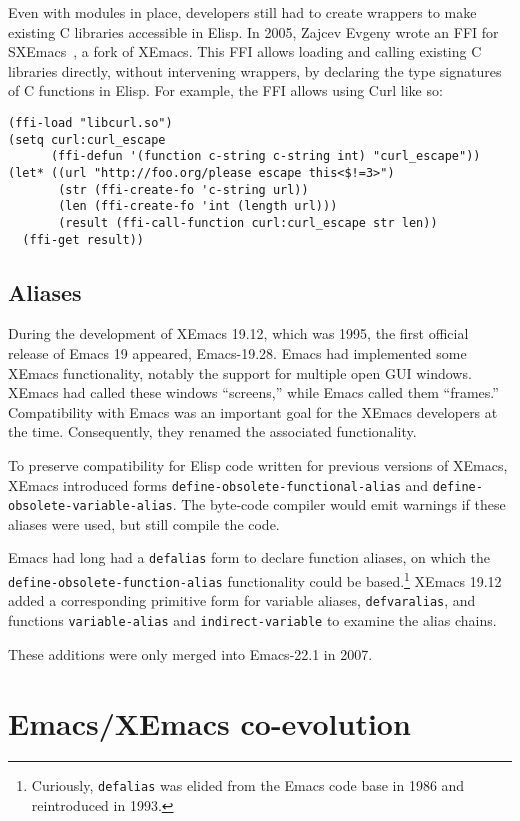 \documentclass[format=acmsmall, review=false, screen=true]{acmart}
\newcommand \Elisp {Elisp}
\begin{document}
Even with modules in place, developers still had to create wrappers to
make existing C libraries accessible in \Elisp{}.  In 2005, Zajcev
Evgeny wrote an FFI for SXEmacs~\cite{SXEmacs}, a fork of XEmacs.
This FFI allows loading and calling existing C libraries directly,
without intervening wrappers, by declaring the type signatures of C
functions in \Elisp{}.  For example, the FFI allows using Curl like
so:
%
\begin{verbatim}
(ffi-load "libcurl.so")
(setq curl:curl_escape
      (ffi-defun '(function c-string c-string int) "curl_escape"))
(let* ((url "http://foo.org/please escape this<$!=3>")
       (str (ffi-create-fo 'c-string url))
       (len (ffi-create-fo 'int (length url)))
       (result (ffi-call-function curl:curl_escape str len))
  (ffi-get result))
\end{verbatim}

\subsection{Aliases}

During the development of XEmacs 19.12, which was 1995, the first
official release of Emacs 19 appeared, Emacs-19.28.  Emacs had
implemented some XEmacs functionality, notably the support for
multiple open GUI windows.  XEmacs had called these windows
``screens,'' while Emacs called them ``frames.''  Compatibility with
Emacs was an important goal for the XEmacs developers at the time.
Consequently, they renamed the associated functionality.

To preserve compatibility for \Elisp{} code written for previous
versions of XEmacs, XEmacs introduced forms
\texttt{define-obsolete-functional-alias} and
\texttt{define-obsolete-variable-alias}.  The byte-code compiler would
emit warnings if these aliases were used, but still compile the code.

Emacs had long had a \texttt{defalias} form to declare function
aliases, on which the \texttt{define-obsolete-function-alias}
functionality could be based.\footnote{Curiously, \texttt{defalias}
  was elided from the Emacs code base in 1986 and reintroduced in
  1993.}  XEmacs 19.12 added a corresponding primitive form for variable
aliases, \texttt{defvaralias}, and functions \texttt{variable-alias}
and \texttt{indirect-variable} to examine the alias chains.

These additions were only merged into Emacs-22.1 in 2007.

\section{Emacs/XEmacs co-evolution}
\label{sec:coevolution}
\end{document}
